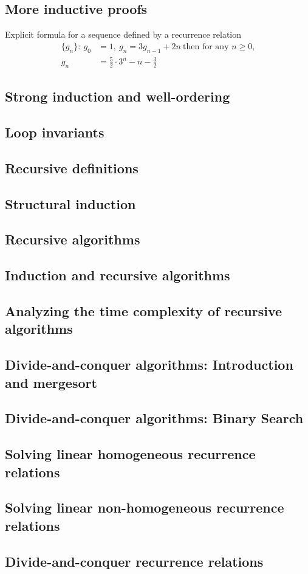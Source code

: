 \subsection{More inductive proofs}
Explicit formula for a sequence defined by a recurrence relation
\begin{align*}
  \{g_n\}:~g_0 & =1,~g_n=3g_{n-1} + 2n~\text{then for any $n \geq 0$,} \\
  g_n          & = \frac{5}{2} \cdot 3^n - n - \frac{3}{2}
\end{align*}

\subsection{Strong induction and well-ordering}


\subsection{Loop invariants}


\subsection{Recursive definitions}


\subsection{Structural induction}


\subsection{Recursive algorithms}


\subsection{Induction and recursive algorithms}


\subsection{Analyzing the time complexity of recursive algorithms}


\subsection{Divide-and-conquer algorithms: Introduction and mergesort}


\subsection{Divide-and-conquer algorithms: Binary Search}


\subsection{Solving linear homogeneous recurrence relations}


\subsection{Solving linear non-homogeneous recurrence relations}


\subsection{Divide-and-conquer recurrence relations}
